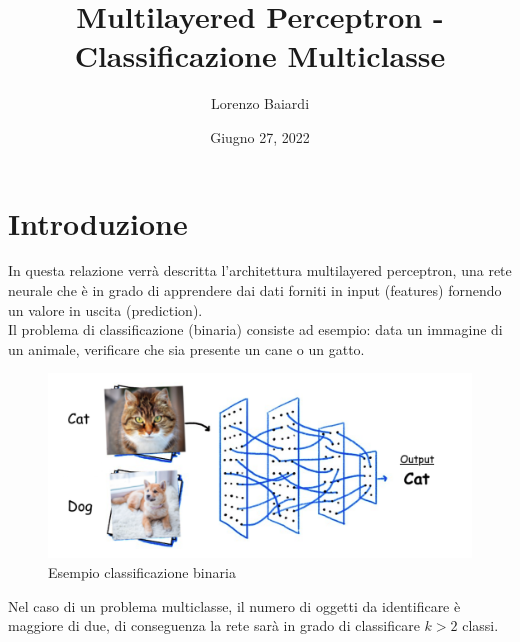 \documentclass{article}
\title{Multilayered Perceptron - Classificazione Multiclasse}
\author{Lorenzo Baiardi}
\date{Giugno 27, 2022}
\begin{document}
\maketitle
    \section{Introduzione}\label{sec:introduzione}
        In questa relazione verrà descritta l'architettura multilayered perceptron,
        una rete neurale che è in grado di apprendere dai dati forniti in input (features) fornendo un valore in uscita (prediction). \\
        Il problema di classificazione (binaria) consiste ad esempio: data un immagine di un animale, verificare che sia presente un cane o un gatto.
        \begin{figure}[H]
            \centering
            \includegraphics[scale=0.50]{classification_problem}
            \caption{Esempio classificazione binaria}
            \label{fig:figureClassification}
        \end{figure}
        Nel caso di un problema multiclasse, il numero di oggetti da identificare è maggiore di due, di conseguenza la rete sarà in grado di
        classificare $k>2$ classi.
\end{document}

